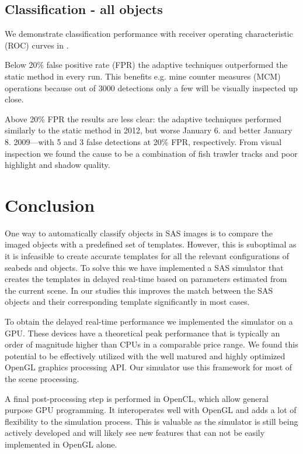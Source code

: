 \subsection{Classification - all objects}

We demonstrate classification performance with receiver operating characteristic (ROC) curves in . 

Below 20\% false positive rate (FPR) the adaptive techniques outperformed the static method in every run. This benefits e.g. mine counter measures (MCM) operations because out of 3000 detections only a few will be visually inspected up close.

Above 20\% FPR the results are less clear: the adaptive techniques performed similarly to the static method in 2012, but worse January 6. and better January 8. 2009---with 5 and 3 false detections at 20\% FPR, respectively. From visual inspection we found the cause to be a combination of fish trawler tracks and poor highlight and shadow quality.



\section{Conclusion}\label{IV_conclusion}

One way to automatically classify objects in SAS images is to compare the imaged objects with a predefined set of templates. However, this is suboptimal as it is infeasible to create accurate templates for all the relevant configurations of seabeds and objects. To solve this we have implemented a SAS simulator that creates the templates in delayed real-time based on parameters estimated from the current scene. In our studies this improves the match between the SAS objects and their corresponding template significantly in most cases.

To obtain the delayed real-time performance we implemented the simulator on a GPU. These devices have a theoretical peak performance that is typically an order of magnitude higher than CPUs in a comparable price range. We found this potential to be effectively utilized with the well matured and highly optimized OpenGL graphics processing API. Our simulator use this framework for most of the scene processing.

A final post-processing step is performed in OpenCL, which allow general purpose GPU programming. It interoperates well with OpenGL and adds a lot of flexibility to the simulation process. This is valuable as the simulator is still being actively developed and will likely see new features that can not be easily implemented in OpenGL alone.

